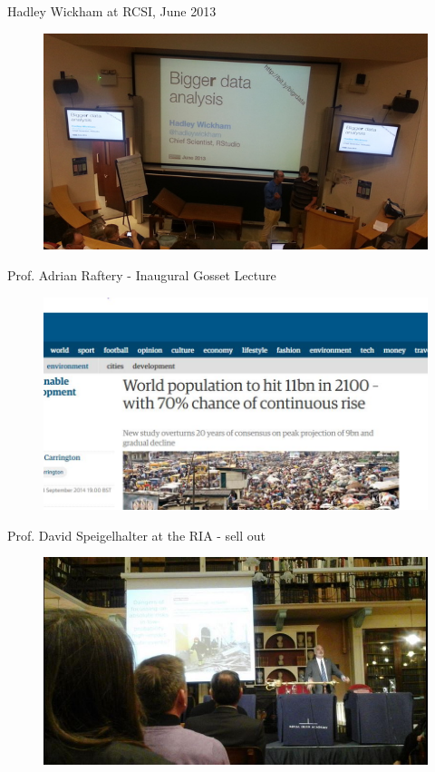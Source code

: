 \documentclass{beamer}
\begin{document}
\begin{frame}
Hadley Wickham at RCSI, June 2013
	\begin{figure}
\centering
\includegraphics[width=0.99\linewidth]{hadleydublin}

\end{figure}

\end{frame}
\begin{frame}
	Prof. Adrian Raftery - Inaugural Gosset Lecture 
\begin{figure}
\centering
\includegraphics[width=0.99\linewidth]{guardian}
\end{figure}
\end{frame}
\begin{frame}
	Prof. David Speigelhalter at the RIA  -  sell out
	\begin{figure}
		\centering
		\includegraphics[width=0.99\linewidth]{riaevent}
	\end{figure}
\end{frame}
\end{document}
